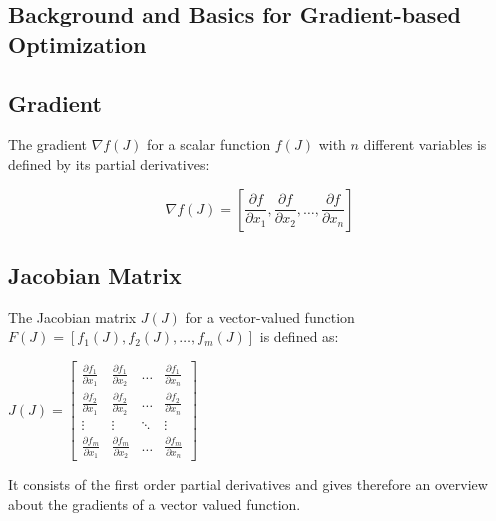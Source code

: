 \documentclass[
  letterpaper,
  DIV=11,
  numbers=noendperiod]{scrreprt}
\begin{document}
\hypertarget{background-and-basics-for-gradient-based-optimization}{%
\subsection{Background and Basics for Gradient-based
Optimization}\label{background-and-basics-for-gradient-based-optimization}}

\hypertarget{gradient}{%
\subsection{Gradient}\label{gradient}}

The gradient \(\nabla f(J)\) for a scalar function \(f(J)\) with \(n\)
different variables is defined by its partial derivatives:

\[\nabla f(J) = \left[ \frac{\partial f}{\partial x_1}, \frac{\partial f}{\partial x_2}, \ldots, \frac{\partial f}{\partial x_n} \right]\]

\hypertarget{jacobian-matrix}{%
\subsection{Jacobian Matrix}\label{jacobian-matrix}}

The Jacobian matrix \(J(J)\) for a vector-valued function
\(F(J) = [f_1(J), f_2(J), \ldots, f_m(J)]\) is defined as:

\(J(J) = \begin{bmatrix} \frac{\partial f_1}{\partial x_1} & \frac{\partial f_1}{\partial x_2} & \ldots & \frac{\partial f_1}{\partial x_n} \\ \frac{\partial f_2}{\partial x_1} & \frac{\partial f_2}{\partial x_2} & \ldots & \frac{\partial f_2}{\partial x_n} \\ \vdots & \vdots & \ddots & \vdots \\ \frac{\partial f_m}{\partial x_1} & \frac{\partial f_m}{\partial x_2} & \ldots & \frac{\partial f_m}{\partial x_n} \end{bmatrix}\)

It consists of the first order partial derivatives and gives therefore
an overview about the gradients of a vector valued function.
\end{document}
